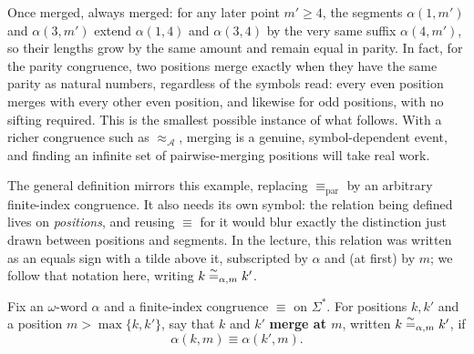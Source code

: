 \begin{example}
Once merged, always merged: for any later point $m'\geq 4$, the
segments $\alpha(1,m')$ and $\alpha(3,m')$ extend $\alpha(1,4)$ and
$\alpha(3,4)$ by the very same suffix $\alpha(4,m')$, so their lengths
grow by the same amount and remain equal in parity.  In fact, for the
parity congruence, two positions merge exactly when they have the same
parity as natural numbers, regardless of the symbols read: every even
position merges with every other even position, and likewise for odd
positions, with no sifting required.  This is the smallest possible
instance of what follows.  With a richer congruence such as
$\approx_{\mathcal A}$, merging is a genuine, symbol-dependent event,
and finding an infinite set of pairwise-merging positions will take
real work.
\end{example}

The general definition mirrors this example, replacing
$\equiv_{\mathrm{par}}$ by an arbitrary finite-index congruence.  It
also needs its own symbol: the relation being defined lives on
\emph{positions}, and reusing $\equiv$ for it would blur exactly the
distinction just drawn between positions and segments.  In the
lecture, this relation was written as an equals sign with a tilde
above it, subscripted by $\alpha$ and (at first) by $m$; we follow that
notation here, writing $k\mathrel{\overset{\sim}{=}_{\alpha,m}}k'$.

\begin{definition}
\label{def:position-merge}
Fix an $\omega$-word $\alpha$ and a finite-index congruence $\equiv$ on
$\Sigma^*$.  For positions $k,k'$ and a position $m>\max\{k,k'\}$, say
that $k$ and $k'$ \textbf{merge at $m$}, written $k\mathrel{\overset{\sim}{=}_{\alpha,m}}k'$,
if
\[
  \alpha(k,m)\equiv\alpha(k',m).
\]
\end{definition}

